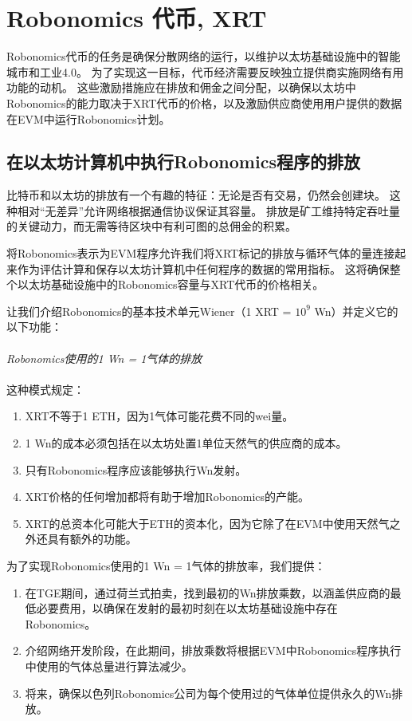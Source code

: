 \documentclass[UTF8]{article}
\begin{document}
\section{Robonomics 代币, XRT}

Robonomics代币的任务是确保分散网络的运行，以维护以太坊基础设施中的智能城市和工业4.0。 为了实现这一目标，代币经济需要反映独立提供商实施网络有用功能的动机。 这些激励措施应在排放和佣金之间分配，以确保以太坊中Robonomics的能力取决于XRT代币的价格，以及激励供应商使用用户提供的数据在EVM中运行Robonomics计划。

\subsection{在以太坊计算机中执行Robonomics程序的排放}

比特币和以太坊的排放有一个有趣的特征：无论是否有交易，仍然会创建块。 这种相对“无差异”允许网络根据通信协议保证其容量。 排放是矿工维持特定吞吐量的关键动力，而无需等待区块中有利可图的总佣金的积累。
 
将Robonomics表示为EVM程序允许我们将XRT标记的排放与循环气体的量连接起来作为评估计算和保存以太坊计算机中任何程序的数据的常用指标。 这将确保整个以太坊基础设施中的Robonomics容量与XRT代币的价格相关。

让我们介绍Robonomics的基本技术单元Wiener（1 XRT = $10^9$ Wn）并定义它的以下功能： 
\\
\\
\textit{Robonomics使用的1 Wn = 1气体的排放}
\\
\\
这种模式规定：
\begin{enumerate}
	\item XRT不等于1 ETH，因为1气体可能花费不同的wei量。
	\item 1 Wn的成本必须包括在以太坊处置1单位天然气的供应商的成本。
	\item 只有Robonomics程序应该能够执行Wn发射。
	\item XRT价格的任何增加都将有助于增加Robonomics的产能。
	\item XRT的总资本化可能大于ETH的资本化，因为它除了在EVM中使用天然气之外还具有额外的功能。
\end{enumerate}

为了实现Robonomics使用的1 Wn = 1气体的排放率，我们提供：

\begin{enumerate}
	\item 在TGE期间，通过荷兰式拍卖，找到最初的Wn排放乘数，以涵盖供应商的最低必要费用，以确保在发射的最初时刻在以太坊基础设施中存在Robonomics。
	\item 介绍网络开发阶段，在此期间，排放乘数将根据EVM中Robonomics程序执行中使用的气体总量进行算法减少。
	\item 将来，确保以色列Robonomics公司为每个使用过的气体单位提供永久的Wn排放。
\end{enumerate}
\end{document}
